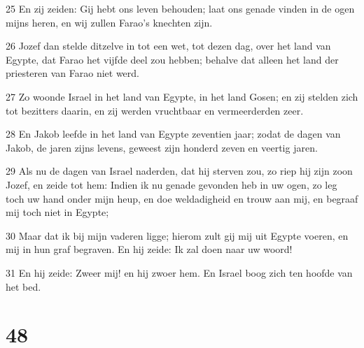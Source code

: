 \par 25 En zij zeiden: Gij hebt ons leven behouden; laat ons genade vinden in de ogen mijns heren, en wij zullen Farao's knechten zijn.
\par 26 Jozef dan stelde ditzelve in tot een wet, tot dezen dag, over het land van Egypte, dat Farao het vijfde deel zou hebben; behalve dat alleen het land der priesteren van Farao niet werd.
\par 27 Zo woonde Israel in het land van Egypte, in het land Gosen; en zij stelden zich tot bezitters daarin, en zij werden vruchtbaar en vermeerderden zeer.
\par 28 En Jakob leefde in het land van Egypte zeventien jaar; zodat de dagen van Jakob, de jaren zijns levens, geweest zijn honderd zeven en veertig jaren.
\par 29 Als nu de dagen van Israel naderden, dat hij sterven zou, zo riep hij zijn zoon Jozef, en zeide tot hem: Indien ik nu genade gevonden heb in uw ogen, zo leg toch uw hand onder mijn heup, en doe weldadigheid en trouw aan mij, en begraaf mij toch niet in Egypte;
\par 30 Maar dat ik bij mijn vaderen ligge; hierom zult gij mij uit Egypte voeren, en mij in hun graf begraven. En hij zeide: Ik zal doen naar uw woord!
\par 31 En hij zeide: Zweer mij! en hij zwoer hem. En Israel boog zich ten hoofde van het bed.

\chapter{48}

